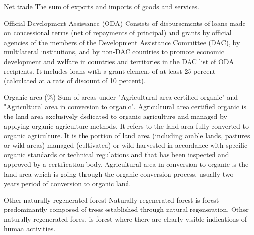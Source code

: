 \begin{MetadataCollection} {}
\begin{metadata}{Net trade} {}
The sum of exports and imports of goods and services.
\end{metadata}

\begin{metadata}{Official Development Assistance (ODA)} {}
Consists of disbursements of loans made on concessional terms (net of repayments of principal) and grants by official agencies of the members of the Development Assistance Committee (DAC), by multilateral institutions, and by non-DAC countries to promote economic development and welfare in countries and territories in the DAC list of ODA recipients. It includes loans with a grant element of at least 25 percent (calculated at a rate of discount of 10 percent). 
\end{metadata}

\begin{metadata}{Organic area (\%)} {}
Sum of areas under "Agricultural area certified organic" and "Agricultural area in conversion to organic". Agricultural area certified organic is the land area exclusively dedicated to organic agriculture and managed by applying organic agriculture methods. It refers to the land area fully converted to organic agriculture. It is the portion of land area (including arable lands, pastures or wild areas) managed (cultivated) or wild harvested in accordance with specific organic standards or technical regulations and that has been inspected and approved by a certification body. Agricultural area in conversion to organic is the land area which is going through the organic conversion process, usually two years period of conversion to organic land.
\end{metadata}

\begin{metadata}{Other naturally regenerated forest} {}
Naturally regenerated forest is forest predominantly composed of trees established through natural regeneration. Other naturally regenerated forest is forest where there are clearly visible indications of human activities.
\end{metadata}


\end{MetadataCollection}
